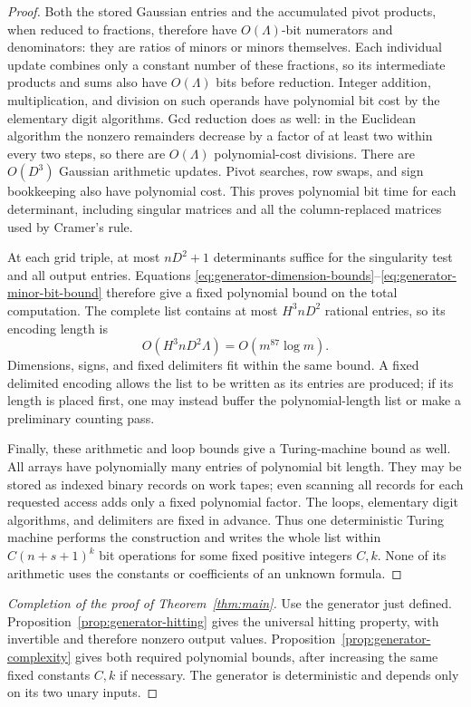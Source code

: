 \begin{proof}
Both the stored Gaussian entries and the accumulated pivot
products, when reduced to fractions, therefore have
$O(\Lambda)$-bit numerators and denominators: they are ratios of
minors or minors themselves. Each individual update combines only
a constant number of these fractions, so its intermediate products
and sums also have $O(\Lambda)$ bits before reduction. Integer
addition, multiplication, and division on such operands have
polynomial bit cost by the elementary digit algorithms. Gcd
reduction does as well: in the Euclidean algorithm the nonzero
remainders decrease by a factor of at least two within every two
steps, so there are $O(\Lambda)$ polynomial-cost divisions.
There are $O(D^3)$ Gaussian arithmetic updates. Pivot searches,
row swaps, and sign bookkeeping also have polynomial cost.
This proves polynomial bit time for each determinant, including
singular matrices and all the column-replaced matrices used by
Cramer's rule.

At each grid triple, at most $nD^2+1$ determinants suffice for the
singularity test and all output entries. Equations
\eqref{eq:generator-dimension-bounds}--\eqref{eq:generator-minor-bit-bound}
therefore give a fixed polynomial bound on the total computation.
The complete list contains at most $H^3 nD^2$ rational entries, so
its encoding length is
\begin{equation}
  O(H^3 nD^2\Lambda)=O(m^{87}\log m).
  \label{eq:generator-output-bit-bound}
\end{equation}
Dimensions, signs, and fixed delimiters fit within the same bound.
A fixed delimited encoding allows the list to be written as its
entries are produced; if its length is placed first, one may instead
buffer the polynomial-length list or make a preliminary counting
pass.

Finally, these arithmetic and loop bounds give a Turing-machine
bound as well. All arrays have polynomially many entries of
polynomial bit length. They may be stored as indexed binary records
on work tapes; even scanning all records for each requested access
adds only a fixed polynomial factor. The loops, elementary digit
algorithms, and delimiters are fixed in advance. Thus one
deterministic Turing machine performs the construction and writes
the whole list within $C(n+s+1)^k$ bit operations for some fixed
positive integers $C,k$. None of its arithmetic uses the constants
or coefficients of an unknown formula.
\end{proof}

\begin{proof}[Completion of the proof of Theorem~\ref{thm:main}]
Use the generator just defined. Proposition~\ref{prop:generator-hitting}
gives the universal hitting property, with invertible and therefore
nonzero output values. Proposition~\ref{prop:generator-complexity}
gives both required polynomial bounds, after increasing the same
fixed constants $C,k$ if necessary. The generator is deterministic
and depends only on its two unary inputs.
\end{proof}
